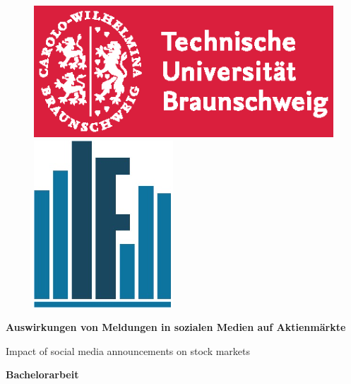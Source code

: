 \documentclass[
	a4paper,
	12pt,
	bibliography=totocnumbered,
	twoside,
]{scrreprt}
\begin{document}

\setcounter{tocdepth}{1} 
\setcounter{secnumdepth}{4}





\begin{figure}[h]
	\vspace{-1.25cm}
	\hspace{-1cm}
	\includegraphics[scale=1.0]{images/tubs_logo.eps}
	\hspace{7.5cm}
	\includegraphics[scale=0.7]{images/fiwi_logo.eps}
\end{figure}

\hspace{5cm}

\begin{center}

	\vspace{3cm}

	\begin{huge}
		\textbf{Auswirkungen von Meldungen in sozialen Medien auf Aktienmärkte}\\
	\end{huge}
	
	\vspace{0.5cm}
	
	\begin{large}
		Impact of social media announcements on stock markets
	\end{large}
	
	\vspace{1.5cm}
	
	\begin{LARGE}
		\textbf{Bachelorarbeit}
	\end{LARGE}
	
\end{center}
\end{document}
